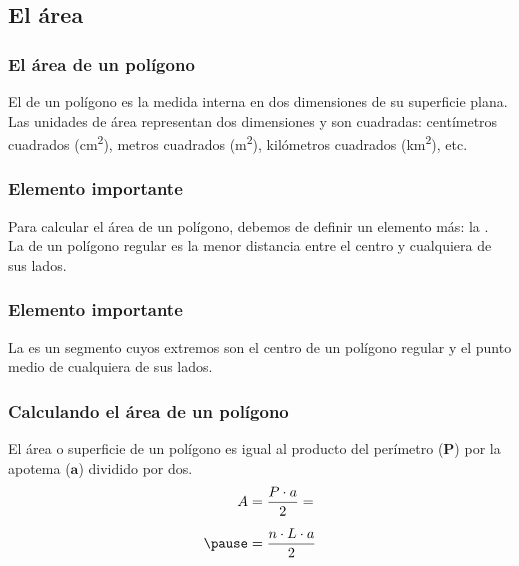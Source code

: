 \documentclass[14pt]{beamer}
\begin{document}
\subsection{El área}

\begin{frame}
\frametitle{El área de un polígono}
El  de un polígono es la medida interna en dos dimensiones de su superficie plana.
\\
\bigskip
\pause
Las unidades de área representan dos dimensiones y son cuadradas: \pause centímetros cuadrados (\unit{\square\centi\meter}), metros cuadrados (\unit{\square\meter}), kilómetros cuadrados (\unit{\square\kilo\meter}), etc. 
\end{frame}
\begin{frame}
\frametitle{Elemento importante}
Para calcular el área de un polígono, debemos de definir un elemento más: \pause la .
\\
\bigskip
\pause
La  de un polígono regular es la menor distancia entre el centro y cualquiera de sus lados. 
\end{frame}
\begin{frame}
\frametitle{Elemento importante}
La  es un segmento cuyos extremos son el centro de un polígono regular y el punto medio de cualquiera de sus lados.
\pause
\begin{figure}
\centering
{}
\end{figure}
\end{frame}
\begin{frame}
\frametitle{Calculando el área de un polígono}
El área o superficie de un polígono es igual al producto del perímetro ($\mathbf{P}$) por la apotema ($\mathbf{a}$) dividido por dos.
\pause
\begin{eqnarray*}
\begin{aligned}
A &= \dfrac{P \cdot a}{2} = \\[0.5em] \pause
&= \dfrac{n \cdot L \cdot a}{2}
\end{aligned}
\end{eqnarray*}
\end{frame}
\end{document}
